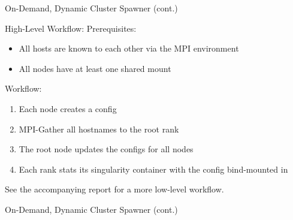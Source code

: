 \documentclass[compress,aspectratio=169]{beamer}
\begin{document}
  \begin{frame}{On-Demand, Dynamic Cluster Spawner (cont.)}
    \begin{block}{High-Level Workflow: }
      Prerequisites:
      \begin{itemize}
        \item All hosts are known to each other via the MPI environment
        \item All nodes have at least one shared mount
      \end{itemize}
      \pause
      Workflow:
      \begin{enumerate}
        \item Each node creates a config
          \pause
        \item MPI-Gather all hostnames to the root rank
          \pause
        \item The root node updates the configs for all nodes
          \pause
        \item Each rank stats its singularity container with the config bind-mounted in
      \end{enumerate}
    \end{block}
    \pause
    \begin{center}
      See the accompanying report for a more low-level workflow.
    \end{center}
	\end{frame}

  \begin{frame}[fragile]{On-Demand, Dynamic Cluster Spawner (cont.)}
    \begin{tcolorbox}[title=Example Generated Config]
    \footnotesize\inputminted[xleftmargin=1em,linenos]{yaml}{./assets/escfg.yml}
    \end{tcolorbox}
	\end{frame}
\end{document}
